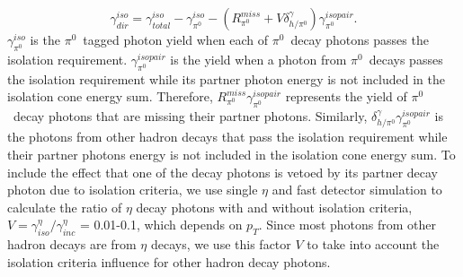 \documentclass[twocolumn,letterpaper,aps,prl,longbibliography,superscriptaddress,floatfix]{revtex4-2}
\newcommand{\pT}{\ensuremath{p_T}}
\newcommand{\pizero}{\ensuremath{\pi^0}}
\begin{document}
\begin{equation} \label{eq:iso}
\gamma_{dir}^{iso} = \gamma_{total}^{iso} - \gamma_{\pi^0}^{iso} - \left( R_{\pi^0}^{miss} + V\delta_{h/\pi^0}^{\gamma} \right) \gamma_{\pi^0}^{isopair}.
\end{equation}
$\gamma_{\pi^0}^{iso}$ is the \pizero \ tagged photon yield when each of \pizero\ decay photons passes the isolation requirement. $\gamma_{\pi^0}^{isopair}$ is the yield when a photon from \pizero\ decays passes the isolation requirement while its partner photon energy is not included in the isolation cone energy sum. Therefore, $R_{\pi^0}^{miss}\gamma_{\pi^0}^{isopair}$ represents the yield of \pizero\ decay photons that are missing their partner photons. Similarly, $\delta_{h/\pi^0}^{\gamma}\gamma_{\pi^0}^{isopair}$ is the photons from other hadron decays that pass the isolation requirement while their partner photons energy is not included in the isolation cone energy sum. To include the effect that one of the decay photons is vetoed by its partner decay photon due to isolation criteria, we use single $\eta$ and fast detector simulation to calculate the ratio of $\eta$ decay photons with and without isolation criteria, $V = \gamma_{iso}^{\eta}/\gamma_{inc}^{\eta}$ = 0.01-0.1, which depends on \pT. Since most photons from other hadron decays are from $\eta$ decays, we use this factor $V$ to take into account the isolation criteria influence for other hadron decay photons.

\end{document}
